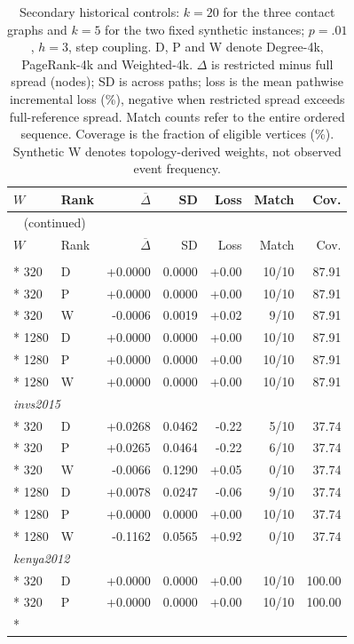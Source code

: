 \begin{longtable}{llrrrrr}
\caption{Secondary historical controls: $k=20$ for the three contact graphs and $k=5$ for the two fixed synthetic instances; $p=.01$, $h=3$, step coupling. D, P and W denote Degree-4k, PageRank-4k and Weighted-4k. $\Delta$ is restricted minus full spread (nodes); SD is across paths; loss is the mean pathwise incremental loss (\%), negative when restricted spread exceeds full-reference spread. Match counts refer to the entire ordered sequence. Coverage is the fraction of eligible vertices (\%). Synthetic W denotes topology-derived weights, not observed event frequency.}\label{tab:hist-secondary}\\
\toprule
$W$ & Rank & $\overline\Delta$ & SD & Loss & Match & Cov. \\
\midrule
\endfirsthead
\multicolumn{7}{l}{\tablename~\thetable{} (continued)}\\
\toprule
$W$ & Rank & $\overline\Delta$ & SD & Loss & Match & Cov. \\
\midrule
\endhead
\bottomrule
\endfoot
\multicolumn{7}{l}{\textit{invs2013}}\\*
320 & D & +0.0000 & 0.0000 & +0.00 & 10/10 & 87.91\\*
320 & P & +0.0000 & 0.0000 & +0.00 & 10/10 & 87.91\\*
320 & W & -0.0006 & 0.0019 & +0.02 & 9/10 & 87.91\\*
1280 & D & +0.0000 & 0.0000 & +0.00 & 10/10 & 87.91\\*
1280 & P & +0.0000 & 0.0000 & +0.00 & 10/10 & 87.91\\*
1280 & W & +0.0000 & 0.0000 & +0.00 & 10/10 & 87.91\\
\multicolumn{7}{l}{\textit{invs2015}}\\*
320 & D & +0.0268 & 0.0462 & -0.22 & 5/10 & 37.74\\*
320 & P & +0.0265 & 0.0464 & -0.22 & 6/10 & 37.74\\*
320 & W & -0.0066 & 0.1290 & +0.05 & 0/10 & 37.74\\*
1280 & D & +0.0078 & 0.0247 & -0.06 & 9/10 & 37.74\\*
1280 & P & +0.0000 & 0.0000 & +0.00 & 10/10 & 37.74\\*
1280 & W & -0.1162 & 0.0565 & +0.92 & 0/10 & 37.74\\
\multicolumn{7}{l}{\textit{kenya2012}}\\*
320 & D & +0.0000 & 0.0000 & +0.00 & 10/10 & 100.00\\*
320 & P & +0.0000 & 0.0000 & +0.00 & 10/10 & 100.00\\*

\end{longtable}
